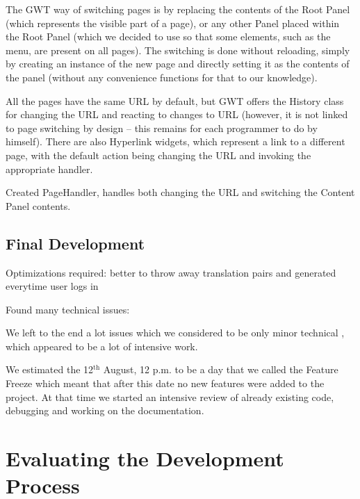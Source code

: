 The GWT way of switching pages is by replacing the contents of the Root Panel (which represents the visible part of a page), or any other Panel placed within the Root Panel (which we decided to use so that some elements, such as the menu, are present on all pages). The switching is done without reloading, simply by creating an instance of the new page and directly setting it as the contents of the panel (without any convenience functions for that to our knowledge).

All the pages have the same URL by default, but GWT offers the History class for changing the URL and reacting to changes to URL (however, it is not linked to page switching by design -- this remains for each programmer to do by himself). There are also Hyperlink widgets, which represent a link to a different page, with the default action being changing the URL and invoking the appropriate handler.

Created PageHandler, handles both changing the URL and switching the Content Panel contents.

\subsubsection{}

\subsubsection{}

\subsection{Final Development}

Optimizations required: better to throw away translation pairs and generated everytime user logs in

Found many technical issues: %


We left to the end a lot issues which we considered to be only minor technical , which appeared to be a lot of intensive work.

We estimated the 12$^\mathrm{th}$ August, 12 p.m. to be a day that we called the Feature Freeze which meant that after this date no new features were added to the project. At that time we started an intensive review of already existing code, debugging and working on the documentation. 

\section{Evaluating the Development Process}

